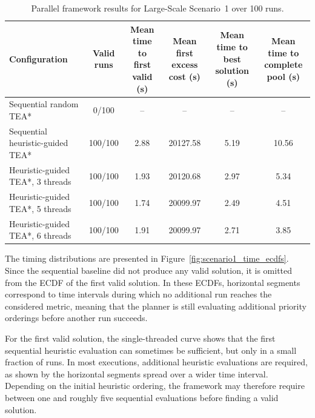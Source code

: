\begin{table}[H]
\centering
\caption{Parallel framework results for Large-Scale Scenario~1 over 100 runs.}
\label{tab:parallel_results_scene1}
\scriptsize
\setlength{\tabcolsep}{4pt}
\begin{tabular}{@{}lccccc@{}}
\toprule
\textbf{Configuration} &
\makecell{\textbf{Valid}\\\textbf{runs}} &
\makecell{\textbf{Mean time to}\\\textbf{first valid (s)}} &
\makecell{\textbf{Mean first}\\\textbf{excess cost (s)}} &
\makecell{\textbf{Mean time to}\\\textbf{best solution (s)}} &
\makecell{\textbf{Mean time to}\\\textbf{complete pool (s)}} \\
\midrule
Sequential random TEA* & 0/100   & --   & --       & --   & --    \\
Sequential heuristic-guided TEA*     & 100/100 & 2.88 & 20127.58 & 5.19 & 10.56 \\
Heuristic-guided TEA*, 3 threads    & 100/100 & 1.93 & 20120.68 & 2.97 & 5.34  \\
Heuristic-guided TEA*, 5 threads    & 100/100 & 1.74 & 20099.97 & 2.49 & 4.51  \\
Heuristic-guided TEA*, 6 threads    & 100/100 & 1.91 & 20099.97 & 2.71 & 3.85  \\
\bottomrule
\end{tabular}
\end{table}

The timing distributions are presented in Figure~\ref{fig:scenario1_time_ecdfs}. Since the
sequential baseline did not produce any valid solution, it is omitted from the ECDF of the first
valid solution. In these ECDFs, horizontal segments correspond to time intervals during which no
additional run reaches the considered metric, meaning that the planner is still evaluating additional
priority orderings before another run succeeds.

For the first valid solution, the single-threaded curve shows that the first sequential heuristic
evaluation can sometimes be sufficient, but only in a small fraction of runs. In most executions,
additional heuristic evaluations are required, as shown by the horizontal segments spread over a
wider time interval. Depending on the initial heuristic ordering, the framework may therefore
require between one and roughly five sequential evaluations before finding a valid solution.

